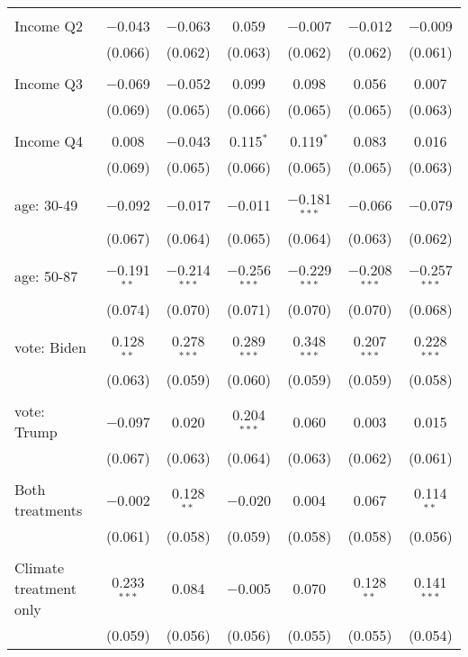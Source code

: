 \begin{tabular}{@{\extracolsep{5pt}}lcccccc}
  & & & & & & \\ 
 Income Q2 & $-$0.043 & $-$0.063 & 0.059 & $-$0.007 & $-$0.012 & $-$0.009 \\ 
  & (0.066) & (0.062) & (0.063) & (0.062) & (0.062) & (0.061) \\ 
  & & & & & & \\ 
 Income Q3 & $-$0.069 & $-$0.052 & 0.099 & 0.098 & 0.056 & 0.007 \\ 
  & (0.069) & (0.065) & (0.066) & (0.065) & (0.065) & (0.063) \\ 
  & & & & & & \\ 
 Income Q4 & 0.008 & $-$0.043 & 0.115$^{*}$ & 0.119$^{*}$ & 0.083 & 0.016 \\ 
  & (0.069) & (0.065) & (0.066) & (0.065) & (0.065) & (0.063) \\ 
  & & & & & & \\ 
 age: 30-49 & $-$0.092 & $-$0.017 & $-$0.011 & $-$0.181$^{***}$ & $-$0.066 & $-$0.079 \\ 
  & (0.067) & (0.064) & (0.065) & (0.064) & (0.063) & (0.062) \\ 
  & & & & & & \\ 
 age: 50-87 & $-$0.191$^{**}$ & $-$0.214$^{***}$ & $-$0.256$^{***}$ & $-$0.229$^{***}$ & $-$0.208$^{***}$ & $-$0.257$^{***}$ \\ 
  & (0.074) & (0.070) & (0.071) & (0.070) & (0.070) & (0.068) \\ 
  & & & & & & \\ 
 vote: Biden & 0.128$^{**}$ & 0.278$^{***}$ & 0.289$^{***}$ & 0.348$^{***}$ & 0.207$^{***}$ & 0.228$^{***}$ \\ 
  & (0.063) & (0.059) & (0.060) & (0.059) & (0.059) & (0.058) \\ 
  & & & & & & \\ 
 vote: Trump & $-$0.097 & 0.020 & 0.204$^{***}$ & 0.060 & 0.003 & 0.015 \\ 
  & (0.067) & (0.063) & (0.064) & (0.063) & (0.062) & (0.061) \\ 
  & & & & & & \\ 
 Both treatments & $-$0.002 & 0.128$^{**}$ & $-$0.020 & 0.004 & 0.067 & 0.114$^{**}$ \\ 
  & (0.061) & (0.058) & (0.059) & (0.058) & (0.058) & (0.056) \\ 
  & & & & & & \\ 
 Climate treatment only & 0.233$^{***}$ & 0.084 & $-$0.005 & 0.070 & 0.128$^{**}$ & 0.141$^{***}$ \\ 
  & (0.059) & (0.056) & (0.056) & (0.055) & (0.055) & (0.054) \\ 

\end{tabular}
